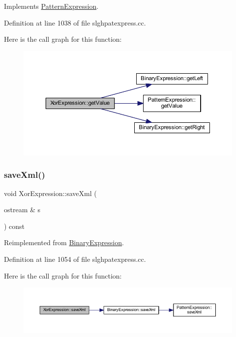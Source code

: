 Implements \mbox{\hyperlink{class_pattern_expression_a8332c6ea4c5a7e9dfc690df2a6458bb8}{Pattern\+Expression}}.



Definition at line 1038 of file slghpatexpress.\+cc.

Here is the call graph for this function\+:
\nopagebreak
\begin{figure}[H]
\begin{center}
\leavevmode
\includegraphics[width=350pt]{class_xor_expression_a2f099da41343681d42dcc1b6c06a88ff_cgraph}
\end{center}
\end{figure}
\mbox{\label{class_xor_expression_a275b64efdd4752af7b69923475286f43}} 
\subsubsection{\texorpdfstring{saveXml()}{saveXml()}}
{\footnotesize\ttfamily void Xor\+Expression\+::save\+Xml (\begin{DoxyParamCaption}\item[{ostream \&}]{s }\end{DoxyParamCaption}) const\hspace{0.3cm}{\ttfamily [virtual]}}



Reimplemented from \mbox{\hyperlink{class_binary_expression_a4b9e768a619b713d6c1ff35a618d98ec}{Binary\+Expression}}.



Definition at line 1054 of file slghpatexpress.\+cc.

Here is the call graph for this function\+:
\nopagebreak
\begin{figure}[H]
\begin{center}
\leavevmode
\includegraphics[width=350pt]{class_xor_expression_a275b64efdd4752af7b69923475286f43_cgraph}
\end{center}
\end{figure}


